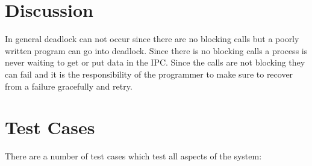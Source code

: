 \documentclass{article}
\begin{document}
\begin{figure}[!h]
\end{figure}

\section{Discussion}
In general deadlock can not occur since there are no blocking calls but a poorly written program can go into deadlock. Since there is no blocking calls a process is never waiting to get or put data in the IPC. Since the calls are not blocking they can fail and it is the responsibility of the programmer to make sure to recover from a failure gracefully and retry. 

\section{Test Cases}

There are a number of test cases which test all aspects of the system:
\end{document}
